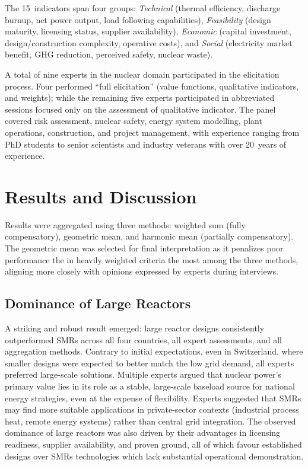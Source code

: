 \documentclass[11pt,a4paper,twocolumn]{article}
\begin{document}
The 15~indicators span four groups: \textit{Technical} (thermal efficiency, discharge burnup, net power output, load following capabilities), \textit{Feasibility} (design maturity, licensing status, supplier availability), \textit{Economic} (capital investment, design/construction complexity, operative costs), and \textit{Social} (electricity market benefit, GHG reduction, perceived safety, nuclear waste).

A total of nine experts in the nuclear domain participated in the elicitation process. Four performed ``full elicitation'' (value functions, qualitative indicators, and weights); while the remaining five experts participated in abbreviated sessions focused only on the assessment of  qualitative indicator. The panel covered risk assessment, nuclear safety, energy system modelling, plant operations, construction, and project management, with experience ranging from PhD students to senior scientists and industry veterans with over 20~years of experience.

\section{Results and Discussion}
\label{sec:results}

Results were aggregated using three methods: weighted sum (fully compensatory), geometric mean, and harmonic mean (partially compensatory). The geometric mean was selected for final interpretation as it penalizes poor performance the in heavily weighted criteria the most among the three methods, aligning more closely with opinions expressed by experts during interviews.

\subsection{Dominance of Large Reactors}

A striking and robust result emerged: large reactor designs consistently outperformed SMRs across all four countries, all expert assessments, and all aggregation methods. Contrary to initial expectations, even in Switzerland, where smaller designs were expected to better match the low grid demand, all experts preferred large-scale solutions. Multiple experts argued that nuclear power's primary value lies in its role as a stable, large-scale baseload source for national energy strategies, even at the expense of flexibility. Experts suggested that SMRs may find more suitable applications in private-sector contexts (industrial process heat, remote energy systems) rather than central grid integration. The observed dominance of large reactors was also driven by their advantages in licensing readiness, supplier availability, and proven ground, all of which favour established designs over SMRs technologies which lack substantial operational demonstration.
\end{document}

